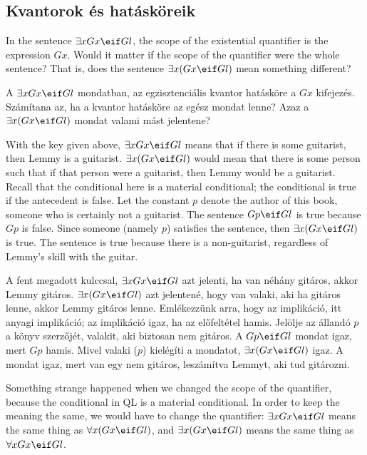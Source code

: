 \subsection{Kvantorok és hatásköreik}


In the sentence $\exists x Gx \eif Gl$, the scope of the existential quantifier is the expression $Gx$. Would it matter if the scope of the quantifier were the whole sentence? That is, does the sentence $\exists x (Gx \eif Gl)$ mean something different?

A $\exists x Gx \eif Gl$ mondatban, az egzisztenciális kvantor hatásköre a $Gx$ kifejezés. Számítana az, ha a kvantor hatásköre az egész mondat lenne? Azaz a $\exists x (Gx \eif Gl)$ mondat valami mást jelentene?


With the key given above, $\exists x Gx \eif Gl$ means that if there is some guitarist, then Lemmy is a guitarist. $\exists x (Gx \eif Gl)$ would mean that there is some person such that if that person were a guitarist, then Lemmy would be a guitarist. Recall that the conditional here is a material conditional; the conditional is true if the antecedent is false. Let the constant $p$ denote the author of this book, someone who is certainly not a guitarist. The sentence $Gp \eif Gl$ is true because $Gp$ is false. Since someone (namely $p$) satisfies the sentence, then $\exists x (Gx \eif Gl)$ is true. The sentence is true because there is a non-guitarist, regardless of Lemmy's skill with the guitar.

A fent megadott kulccsal, $\exists x Gx \eif Gl$ azt jelenti, ha van néhány gitáros, akkor Lemmy gitáros. $\exists x (Gx \eif Gl)$ azt jelentené, hogy van valaki, aki ha gitáros lenne, akkor Lemmy gitáros lenne. Emlékezzünk arra, hogy az implikáció, itt anyagi implikáció; az implikáció igaz, ha az előfeltétel hamis. Jelölje az állandó $p$ a könyv szerzőjét, valakit, aki biztosan nem gitáros. A $Gp \eif Gl$ mondat igaz, mert $Gp$ hamis. Mivel valaki ($p$) kielégíti a mondatot, $\exists x (Gx \eif Gl)$ igaz. A mondat igaz, mert van egy nem gitáros, leszámítva Lemmyt, aki tud gitározni.





Something strange happened when we changed the scope of the quantifier, because the conditional in QL is a material conditional. In order to keep the meaning the same, we would have to change the quantifier: $\exists x Gx \eif Gl$ means the same thing as $\forall x (Gx \eif Gl)$, and $\exists x (Gx \eif Gl)$ means the same thing as $\forall x Gx \eif Gl$.

